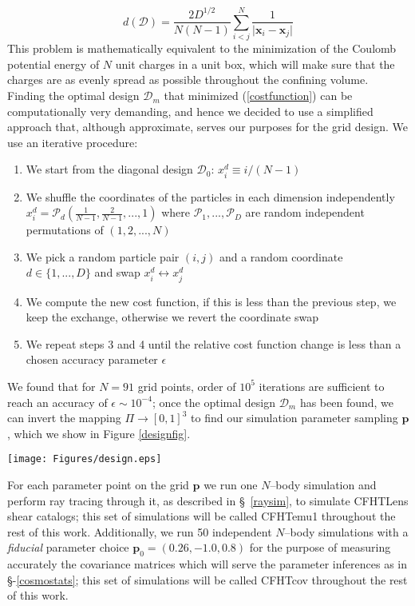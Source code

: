 \documentclass[reprint,aps,prd,superscriptaddress,showkeys]{revtex4-1}
\begin{document}
\begin{equation}
\label{costfunction}
d(\mathcal{D}) = \frac{2D^{1/2}}{N(N-1)}\sum_{i<j}^N\frac{1}{\vert\mathbf{x}_i-\mathbf{x}_j\vert}
\end{equation} 
%
This problem is mathematically equivalent to the minimization of the Coulomb potential energy of $N$ unit charges in a unit box, which will make sure that the charges are as evenly spread as possible throughout the confining volume. Finding the optimal design $\mathcal{D}_m$ that minimized (\ref{costfunction}) can be computationally very demanding, and hence we decided to use a simplified approach that, although approximate, serves our purposes for the grid design. We use an iterative procedure:
\begin{enumerate}
\item We start from the diagonal design $\mathcal{D}_0$: $x_i^d\equiv i/(N-1)$
\item We shuffle the coordinates of the particles in each dimension independently $x_i^d = \mathcal{P}_d\left(\frac{1}{N-1},\frac{2}{N-1},...,1\right)$ where $\mathcal{P}_1,...,\mathcal{P}_D$ are random independent permutations of $(1,2,...,N)$
\item We pick a random particle pair $(i,j)$ and a random coordinate $d\in\{1,...,D\}$ and swap $x_i^d\leftrightarrow x_j^d$
\item We compute the new cost function, if this is less than the previous step, we keep the exchange, otherwise we revert the coordinate swap
\item We repeat steps 3 and 4 until the relative cost function change is less than a chosen accuracy parameter $\epsilon$ 
\end{enumerate}
%
We found that for $N=91$ grid points, order of $10^5$ iterations are sufficient to reach an accuracy of $\epsilon\sim10^{-4}$; once the optimal design $\mathcal{D}_m$ has been found, we can invert the mapping $\Pi\rightarrow[0,1]^3$ to find our simulation parameter sampling $\mathbf{p}$, which we show in 
Figure \ref{designfig}.
%
\begin{figure*}
\begin{center}
\texttt{[image: Figures/design.eps]}
\caption{$(\Omega_m,w)$ and $(w,\sigma_8)$ projections of our the simulation design; the blue points correspond to the CFHTemu1 simulation set, which consists of one $N$--body simulation per point, while the red point corresponds to the CFHTcov simulation set, which is based on 50 independent $N$--body simulations}
\label{designfig}
\end{center}
\end{figure*}
%
For each parameter point on the grid $\mathbf{p}$ we run one $N$--body simulation and perform ray tracing through it, as described in \S~\ref{raysim}, to simulate CFHTLens shear catalogs; this set of simulations will be called CFHTemu1 throughout the rest of this work. Additionally, we run 50 independent $N$--body simulations with a \textit{fiducial} parameter choice $\mathbf{p}_0=(0.26,-1.0,0.8)$ for the purpose of measuring accurately the covariance matrices which will serve the parameter inferences as in \S-\ref{cosmostats}; this set of simulations will be called CFHTcov throughout the rest of this work.    
\end{document}

